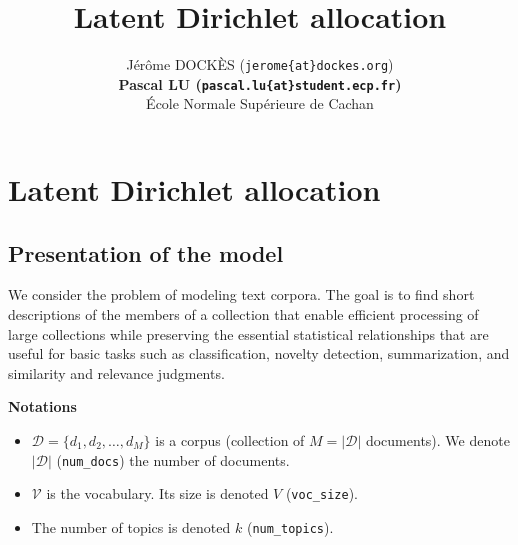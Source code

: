 \documentclass{article}
\title{Latent Dirichlet allocation}
\author{
J\'er\^ome DOCK\`ES (\texttt{jerome\{at\}dockes.org}) \\
\textbf{Pascal LU (\texttt{pascal.lu\{at\}student.ecp.fr})} \\
\'Ecole Normale Sup\'erieure de Cachan \\
}
\begin{document}
\maketitle

\section{Latent Dirichlet allocation}
\subsection{Presentation of the model}

We consider the problem of modeling text corpora. The goal is to find short descriptions of the members of a collection that enable efficient processing of large collections while preserving the essential statistical relationships that are useful for basic tasks such as classification, novelty detection, summarization, and similarity and relevance judgments.

\medskip

\textbf{Notations}
\begin{itemize}
\setlength\itemsep{-0.2em}
  \item $\mathcal{D} = \{d_{1},d_{2}, \ldots, d_{M}\}$ is a corpus (collection of $M=|\mathcal{D}|$ documents). We denote $|\mathcal{D}|$ (\verb"num_docs") the number of documents.
  \item $\mathcal{V}$ is the vocabulary. Its size is denoted $V$ (\verb"voc_size").
  \item The number of topics is denoted $k$ (\verb"num_topics").
\end{itemize}
\end{document}
